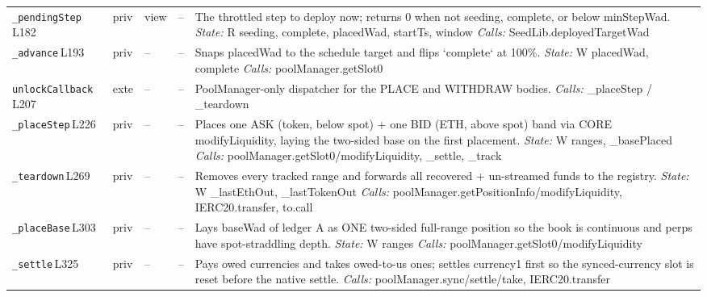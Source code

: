 \begin{longtable}{@{}>{\raggedright\arraybackslash}p{}p{}p{}p{}>{\raggedright\arraybackslash}p{}@{}}
\texttt{\_pending\allowbreak{}Step}\,{\tiny L182} & priv & view & -- & The throttled step to deploy now; returns 0 when not seeding, complete, or below minStepWad. \newline \textit{State:} R seeding,\allowbreak{} complete,\allowbreak{} placedWad,\allowbreak{} startTs,\allowbreak{} window \newline \textit{Calls:} SeedLib.\allowbreak{}deployedTargetWad \\
\texttt{\_advance}\,{\tiny L193} & priv & -- & -- & Snaps placedWad to the schedule target and flips `complete` at 100\%. \newline \textit{State:} W placedWad,\allowbreak{} complete \newline \textit{Calls:} poolManager.\allowbreak{}getSlot0 \\
\texttt{unlock\allowbreak{}Callback}\,{\tiny L207} & exte & -- & -- & PoolManager-only dispatcher for the PLACE and WITHDRAW bodies. \newline \textit{Calls:} \_placeStep /\allowbreak{} \_teardown \\
\texttt{\_place\allowbreak{}Step}\,{\tiny L226} & priv & -- & -- & Places one ASK (token, below spot) + one BID (ETH, above spot) band via CORE modifyLiquidity, laying the two-sided base on the first placement. \newline \textit{State:} W ranges,\allowbreak{} \_basePlaced \newline \textit{Calls:} poolManager.\allowbreak{}getSlot0/\allowbreak{}modifyLiquidity,\allowbreak{} \_settle,\allowbreak{} \_track \\
\texttt{\_teardown}\,{\tiny L269} & priv & -- & -- & Removes every tracked range and forwards all recovered + un-streamed funds to the registry. \newline \textit{State:} W \_lastEthOut,\allowbreak{} \_lastTokenOut \newline \textit{Calls:} poolManager.\allowbreak{}getPositionInfo/\allowbreak{}modifyLiquidity,\allowbreak{} IERC20.\allowbreak{}transfer,\allowbreak{} to.\allowbreak{}call \\
\texttt{\_place\allowbreak{}Base}\,{\tiny L303} & priv & -- & -- & Lays baseWad of ledger A as ONE two-sided full-range position so the book is continuous and perps have spot-straddling depth. \newline \textit{State:} W ranges \newline \textit{Calls:} poolManager.\allowbreak{}getSlot0/\allowbreak{}modifyLiquidity \\
\texttt{\_settle}\,{\tiny L325} & priv & -- & -- & Pays owed currencies and takes owed-to-us ones; settles currency1 first so the synced-currency slot is reset before the native settle. \newline \textit{Calls:} poolManager.\allowbreak{}sync/\allowbreak{}settle/\allowbreak{}take,\allowbreak{} IERC20.\allowbreak{}transfer \\

\end{longtable}

